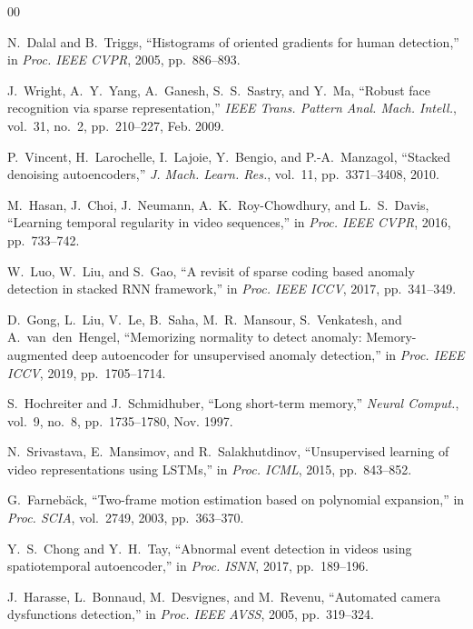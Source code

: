 \documentclass[conference]{IEEEtran}
\begin{document}
\begin{thebibliography}{00}

N.~Dalal and B.~Triggs, ``Histograms of oriented gradients for human
detection,'' in \textit{Proc. IEEE CVPR}, 2005, pp.~886--893.

J.~Wright, A.~Y.~Yang, A.~Ganesh, S.~S.~Sastry, and Y.~Ma, ``Robust face
recognition via sparse representation,'' \textit{IEEE Trans. Pattern Anal.
Mach. Intell.}, vol.~31, no.~2, pp.~210--227, Feb. 2009.

P.~Vincent, H.~Larochelle, I.~Lajoie, Y.~Bengio, and
P.-A.~Manzagol, ``Stacked denoising autoencoders,'' \textit{J. Mach.
Learn. Res.}, vol.~11, pp.~3371--3408, 2010.

M.~Hasan, J.~Choi, J.~Neumann, A.~K.~Roy-Chowdhury, and
L.~S.~Davis, ``Learning temporal regularity in video sequences,'' in
\textit{Proc. IEEE CVPR}, 2016, pp.~733--742.

W.~Luo, W.~Liu, and S.~Gao, ``A revisit of sparse coding based anomaly
detection in stacked RNN framework,'' in \textit{Proc. IEEE ICCV}, 2017,
pp.~341--349.

D.~Gong, L.~Liu, V.~Le, B.~Saha, M.~R.~Mansour, S.~Venkatesh, and
A.~van~den~Hengel, ``Memorizing normality to detect anomaly: Memory-augmented
deep autoencoder for unsupervised anomaly detection,'' in \textit{Proc.
IEEE ICCV}, 2019, pp.~1705--1714.

S.~Hochreiter and J.~Schmidhuber, ``Long short-term memory,''
\textit{Neural Comput.}, vol.~9, no.~8, pp.~1735--1780, Nov. 1997.

N.~Srivastava, E.~Mansimov, and R.~Salakhutdinov, ``Unsupervised learning
of video representations using LSTMs,'' in \textit{Proc. ICML}, 2015,
pp.~843--852.

G.~Farnebäck, ``Two-frame motion estimation based on polynomial
expansion,'' in \textit{Proc. SCIA}, vol.~2749, 2003, pp.~363--370.

Y.~S.~Chong and Y.~H.~Tay, ``Abnormal event detection in videos using
spatiotemporal autoencoder,'' in \textit{Proc. ISNN}, 2017,
pp.~189--196.

J.~Harasse, L.~Bonnaud, M.~Desvignes, and M.~Revenu, ``Automated
camera dysfunctions detection,'' in \textit{Proc. IEEE AVSS}, 2005,
pp.~319--324.


\end{thebibliography}
\end{document}
